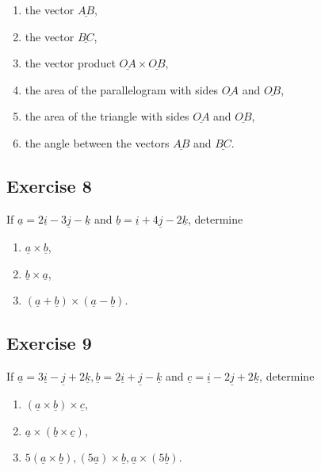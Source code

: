 \documentclass[
  english,
  11pt,
  oneside]{book}
\providecommand{\tightlist}{%
  \setlength{\itemsep}{0pt}\setlength{\parskip}{0pt}}
\newcommand{\slide}{}
\theoremstyle{definition}
\theoremstyle{definition}
\theoremstyle{definition}
\theoremstyle{definition}
\theoremstyle{remark}
\begin{document}
\begin{enumerate}
\def\labelenumi{\roman{enumi}.}
\tightlist
\item
  the vector \(\underline{AB}\),
\item
  the vector \(\underline{BC}\),
\item
  the vector product \(\underline{OA} \times \underline{OB}\),
\item
  the area of the parallelogram with sides \(\underline{OA}\) and \(\underline{OB}\),
\item
  the area of the triangle with sides \(\underline{OA}\) and \(\underline{OB}\),
\item
  the angle between the vectors \(\underline{AB}\) and \(\underline{BC}\).
\end{enumerate}

\slide

\subsection*{Exercise 8}\label{exercise-8-2}

If \(\underline{a} = 2\underline{i} - 3\underline{j} - \underline{k}\) and \(\underline{b} = \underline{i} + 4\underline{j} - 2\underline{k}\), determine

\begin{enumerate}
\def\labelenumi{\roman{enumi}.}
\tightlist
\item
  \(\underline{a} \times \underline{b}\),
\item
  \(\underline{b} \times \underline{a}\),
\item
  \((\underline{a} + \underline{b}) \times (\underline{a} - \underline{b})\).
\end{enumerate}

\slide

\subsection*{Exercise 9}\label{exercise-9-2}

If \(\underline{a} = 3\underline{i} - \underline{j} + 2\underline{k}, \underline{b} = 2\underline{i} + \underline{j} - \underline{k}\) and \(\underline{c} = \underline{i} - 2\underline{j} + 2\underline{k}\), determine

\begin{enumerate}
\def\labelenumi{\roman{enumi}.}
\tightlist
\item
  \((\underline{a} \times \underline{b}) \times \underline{c}\),
\item
  \(\underline{a} \times (\underline{b} \times \underline{c})\),
\item
  \(5(\underline{a} \times \underline{b}), (5\underline{a})\times \underline{b}, \underline{a}\times(5\underline{b})\).
\end{enumerate}
\end{document}
